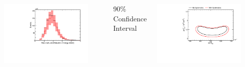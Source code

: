 \documentclass[10pt,professionalfonts,xcolor=table]{beamer}
\begin{document}
\begin{frame}
\begin{columns}[t]
\includegraphics[angle=-90, width=0.85\textwidth]{figures/systs/prediction/nd_mc_prediction_full_syst.pdf}

\vspace{15pt}
\textcolor{custom_red}{90\% Confidence Interval}
\vspace{-10pt}

\includegraphics[angle=-90, width=0.85\textwidth]{figures/systs/prediction/fd_extrap_contour_full_syst.pdf}


\end{columns}



\end{frame}

\begin{frame}
\end{frame}
\end{document}

